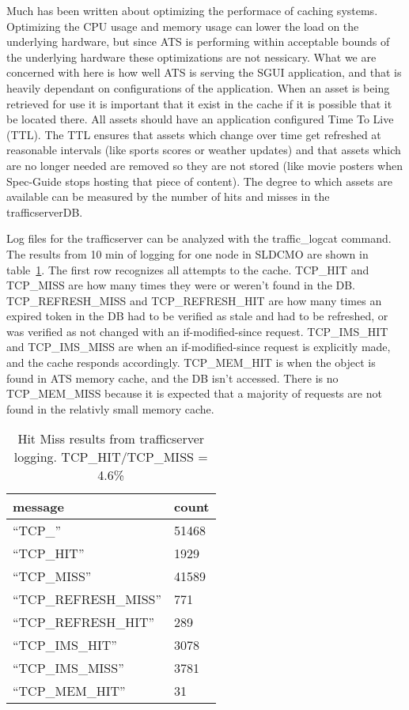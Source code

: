 \documentclass{article}
\begin{document}
Much has been written about optimizing the performace of caching systems. Optimizing the CPU usage and memory usage can lower the load on the underlying hardware, but since ATS is performing within acceptable bounds of the underlying hardware these optimizations are not nessicary. What we are concerned with here is how well ATS is serving the SGUI application, and that is heavily dependant on configurations of the application. When an asset is being retrieved for use it is important that it exist in the cache if it is possible that it be located there. All assets should have an application configured Time To Live (TTL). The TTL ensures that assets which change over time get refreshed at reasonable intervals (like sports scores or weather updates) and that assets which are no longer needed are removed so they are not stored (like movie posters when Spec-Guide stops hosting that piece of content). The degree to which assets are available can be measured by the number of hits and misses in the trafficserverDB. 

Log files for the trafficserver can be analyzed with the traffic\_logcat command. The results from 10 min of logging for one node in SLDCMO are shown in table~\ref{TABLE-HITMISS}. The first row recognizes all attempts to the cache. TCP\_HIT and TCP\_MISS are how many times they were or weren't found in the DB. TCP\_REFRESH\_MISS and TCP\_REFRESH\_HIT are how many times an expired token in the DB had to be verified as stale and had to be refreshed, or was verified as not changed with an if-modified-since request. TCP\_IMS\_HIT and TCP\_IMS\_MISS are when an if-modified-since request is explicitly made, and the cache responds accordingly. TCP\_MEM\_HIT is when the object is found in ATS memory cache, and the DB isn't accessed. There is no TCP\_MEM\_MISS because it is expected that a majority of requests are not found in the relativly small memory cache. 

\begin{table}[h]
\centering
\begin{tabular}{|l|l|} 
\hline message & count \\  
\hline ``TCP\_'' & 51468 \\
\hline ``TCP\_HIT'' & 1929 \\
\hline ``TCP\_MISS'' & 41589 \\
\hline ``TCP\_REFRESH\_MISS'' & 771 \\
\hline ``TCP\_REFRESH\_HIT'' & 289 \\
\hline ``TCP\_IMS\_HIT'' & 3078 \\
\hline ``TCP\_IMS\_MISS'' & 3781 \\
\hline ``TCP\_MEM\_HIT'' & 31 \\
\hline
\end{tabular}
\caption{\label{TABLE-HITMISS} Hit Miss results from trafficserver logging. TCP\_HIT/TCP\_MISS = 4.6\% } 
\end{table}
\end{document}

